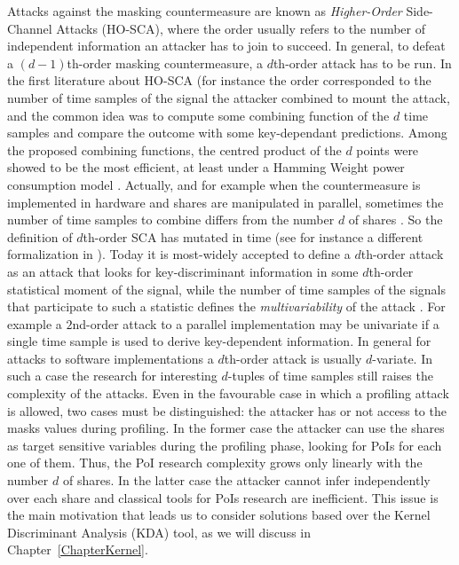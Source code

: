 Attacks against the masking countermeasure are known as \emph{Higher-Order} Side-Channel Attacks (HO-SCA), where the order usually refers to the number of independent information an attacker has to join to succeed. In general, to defeat a $(d-1)$th-order masking countermeasure, a $d$th-order attack has to be run. In the first literature about HO-SCA (for instance \cite{messerges2000using,Waddle2004,joye2005second,oswald2006practical} the order corresponded to the number of time samples of the signal the attacker combined to mount the attack, and the common idea was to compute some combining function of the $d$ time samples and compare the outcome with some key-dependant predictions. Among the proposed combining functions, the centred product of the $d$ points were showed to be the most efficient, at least under a Hamming Weight power consumption model \cite{DBLP:journals/tc/ProuffRB09}. Actually, and for example when the countermeasure is implemented in hardware and shares are manipulated in parallel, sometimes the number of time samples to combine differs from the number $d$ of shares \cite{peeters2005improved,standaert2005masking}. So the definition of $d$th-order SCA has mutated in time (see for instance a different formalization in \cite{piret2008security}). Today it is most-widely accepted to define a $d$th-order attack as an attack that looks for key-discriminant information in some $d$th-order statistical moment of the signal, while the number of time samples of the signals that participate to such a statistic defines the \emph{multivariability} of the attack \cite{gierlichs2010revisiting,batina2011mutual,carlet2014achieving}. For example a $2$nd-order attack to a parallel implementation may be univariate if a single time sample is used to derive key-dependent information. In general for attacks to software implementations a $d$th-order attack is usually $d$-variate. In such a case the research for interesting $d$-tuples of time samples still raises the complexity of the attacks. Even in the favourable case in which a profiling attack is allowed, two cases must be distinguished: the attacker has or not access to the masks values during profiling. In the former case the attacker can use the shares as target sensitive variables during the profiling phase, looking for PoIs for each one of them. Thus, the PoI research complexity grows only linearly with the number $d$ of shares. In the latter case the attacker cannot infer independently over each share and classical tools for PoIs research are inefficient. This issue is the main motivation that leads us to consider solutions based over the Kernel Discriminant Analysis (KDA) tool, as we will discuss in Chapter~\ref{ChapterKernel}.

